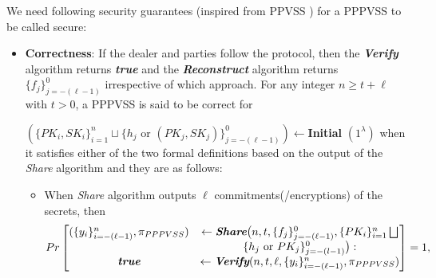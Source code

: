 We need following security guarantees (inspired from PPVSS \cite{cryptoeprint:2025/576}) for a PPPVSS to be 
called secure:

\begin{itemize}
  \item \textbf{Correctness}: If the dealer and parties follow the protocol, then the \textit{\textbf{Verify}} 
    algorithm returns \textit{\textbf{true}} and the \textit{\textbf{Reconstruct}} algorithm returns $\{f_j\}_{j=-(\ell-1)}^0$ 
    irrespective of which approach. For any integer $n\geq t+\ell$ with $t>0$, a PPPVSS is said 
    to be correct for\par 
    $\left(\{PK_i,SK_i\}_{i=1}^n\sqcup\{h_j\text{ or }(PK_j,SK_j)\}_{j=-(\ell-1)}^0\right)\leftarrow$\textbf{Initial} $(1^\lambda)$ when 
    it satisfies either of the two formal definitions based on the output of the \textit{Share} algorithm 
    and they are as follows: 
    \begin{itemize}
      \item When \textit{Share} algorithm outputs $\ell$ commitments(/encryptions) of the secrets, then
        \begin{align*}
          Pr\begin{bmatrix}
            (\{y_i\}_{i=-(\ell-1)}^n,\pi_{PPPVSS})&\leftarrow \textit{\textbf{Share}} \big(n,t,\{f_j\}_{j=-(\ell-1)}^0,\{PK_i\}_{i=1}^n\bigsqcup\\
            &\{h_j\text{ or }PK_j\}_{j=-(l-1)}^0\big):\\
            \textit{\textbf{true}}&\leftarrow \textit{\textbf{Verify}} (n,t,\ell,\{y_i\}_{i=-(\ell-1)}^n,\pi_{PPPVSS})
          \end{bmatrix} = 1,
        \end{align*}
    

\end{itemize}
\end{itemize}
